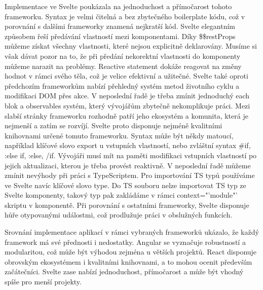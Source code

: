 \begin{zvyraznenyodstavec}
Implementace ve Svelte poukázala na jednoduchost a přímočarost tohoto frameworku. 
Syntax je velmi čitelná a bez zbytečného boilerplate kódu, což v porovnání s dalšími frameworky znamená nejkratší kód. 
Svelte elegantním způsobem řeší předávání vlastností mezi komponentami. 
Díky \$\$restProps můžeme získat všechny vlastnosti, které nejsou explicitně deklarovány. 
Musíme si však dávat pozor na to, že při předání nekorektní vlastnosti do komponenty můžeme narazit na problémy. 
Reactive statement dokáže reagovat na změny hodnot v rámci svého těla, což je velice efektivní a užitečné. 
Svelte také oproti předchozím frameworkům nabízí přehledný systém metod životního cyklu a modifikaci DOM přes akce. 
V neposlední řadě je třeba zmínit jednoduchý each blok a observables systém, který vývojářům zbytečně nekomplikuje práci.
Mezi slabší stránky frameworku rozhodně patří jeho ekosystém a komunita, která je nejmenší a zatím se rozvíjí. 
Svelte proto disponuje nejméně kvalitními knihovnami určené tomuto frameworku. 
Syntax může být někdy matoucí, například klíčové slovo export u vstupních vlastností, nebo zvláštní syntax \#if, :else if, :else, /if. 
Vývojáři musí mít na paměti modifikaci vstupních vlastností po jejich aktualizaci, kterou je třeba provést reaktivně. 
V neposlední řadě můžeme zmínit nevýhody při práci s TypeScriptem. Pro importování TS typů používáme ve Svelte navíc klíčové slovo type. 
Do TS souboru nelze importovat TS typ ze Svelte komponenty, takový typ pak zakládáme v rámci context="'module"' skriptu v komponentě.
Při porovnání s ostatními frameworky, Svelte disponuje hůře otypovanými událostmi, což prodlužuje práci v obslužných funkcích.


Srovnání implementace aplikací v rámci vybraných frameworků ukázalo, že každý framework má své přednosti i nedostatky. 
Angular se vyznačuje robustností a modularitou, což může být výhodou zejména u větších projektů. 
React disponuje obrovským ekosystémem i kvalitními knihovnami, a to mohou ocenit především začátečníci. 
Svelte zase nabízí jednoduchost, přímočarost a může být vhodný spíše pro menší projekty.
\end{zvyraznenyodstavec}